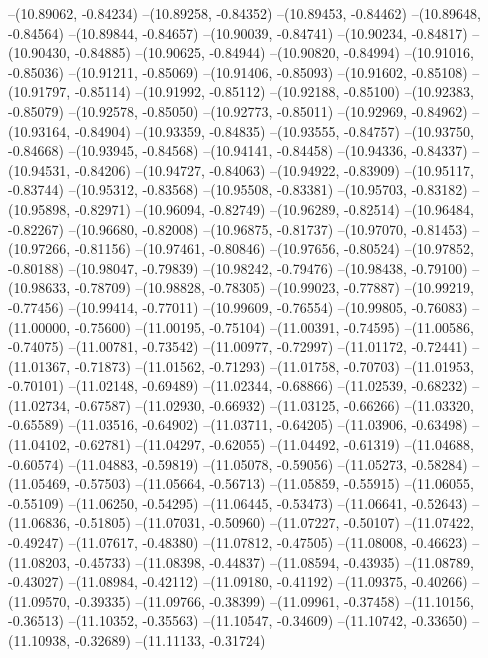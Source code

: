 --(10.89062, -0.84234)
--(10.89258, -0.84352)
--(10.89453, -0.84462)
--(10.89648, -0.84564)
--(10.89844, -0.84657)
--(10.90039, -0.84741)
--(10.90234, -0.84817)
--(10.90430, -0.84885)
--(10.90625, -0.84944)
--(10.90820, -0.84994)
--(10.91016, -0.85036)
--(10.91211, -0.85069)
--(10.91406, -0.85093)
--(10.91602, -0.85108)
--(10.91797, -0.85114)
--(10.91992, -0.85112)
--(10.92188, -0.85100)
--(10.92383, -0.85079)
--(10.92578, -0.85050)
--(10.92773, -0.85011)
--(10.92969, -0.84962)
--(10.93164, -0.84904)
--(10.93359, -0.84835)
--(10.93555, -0.84757)
--(10.93750, -0.84668)
--(10.93945, -0.84568)
--(10.94141, -0.84458)
--(10.94336, -0.84337)
--(10.94531, -0.84206)
--(10.94727, -0.84063)
--(10.94922, -0.83909)
--(10.95117, -0.83744)
--(10.95312, -0.83568)
--(10.95508, -0.83381)
--(10.95703, -0.83182)
--(10.95898, -0.82971)
--(10.96094, -0.82749)
--(10.96289, -0.82514)
--(10.96484, -0.82267)
--(10.96680, -0.82008)
--(10.96875, -0.81737)
--(10.97070, -0.81453)
--(10.97266, -0.81156)
--(10.97461, -0.80846)
--(10.97656, -0.80524)
--(10.97852, -0.80188)
--(10.98047, -0.79839)
--(10.98242, -0.79476)
--(10.98438, -0.79100)
--(10.98633, -0.78709)
--(10.98828, -0.78305)
--(10.99023, -0.77887)
--(10.99219, -0.77456)
--(10.99414, -0.77011)
--(10.99609, -0.76554)
--(10.99805, -0.76083)
--(11.00000, -0.75600)
--(11.00195, -0.75104)
--(11.00391, -0.74595)
--(11.00586, -0.74075)
--(11.00781, -0.73542)
--(11.00977, -0.72997)
--(11.01172, -0.72441)
--(11.01367, -0.71873)
--(11.01562, -0.71293)
--(11.01758, -0.70703)
--(11.01953, -0.70101)
--(11.02148, -0.69489)
--(11.02344, -0.68866)
--(11.02539, -0.68232)
--(11.02734, -0.67587)
--(11.02930, -0.66932)
--(11.03125, -0.66266)
--(11.03320, -0.65589)
--(11.03516, -0.64902)
--(11.03711, -0.64205)
--(11.03906, -0.63498)
--(11.04102, -0.62781)
--(11.04297, -0.62055)
--(11.04492, -0.61319)
--(11.04688, -0.60574)
--(11.04883, -0.59819)
--(11.05078, -0.59056)
--(11.05273, -0.58284)
--(11.05469, -0.57503)
--(11.05664, -0.56713)
--(11.05859, -0.55915)
--(11.06055, -0.55109)
--(11.06250, -0.54295)
--(11.06445, -0.53473)
--(11.06641, -0.52643)
--(11.06836, -0.51805)
--(11.07031, -0.50960)
--(11.07227, -0.50107)
--(11.07422, -0.49247)
--(11.07617, -0.48380)
--(11.07812, -0.47505)
--(11.08008, -0.46623)
--(11.08203, -0.45733)
--(11.08398, -0.44837)
--(11.08594, -0.43935)
--(11.08789, -0.43027)
--(11.08984, -0.42112)
--(11.09180, -0.41192)
--(11.09375, -0.40266)
--(11.09570, -0.39335)
--(11.09766, -0.38399)
--(11.09961, -0.37458)
--(11.10156, -0.36513)
--(11.10352, -0.35563)
--(11.10547, -0.34609)
--(11.10742, -0.33650)
--(11.10938, -0.32689)
--(11.11133, -0.31724)
